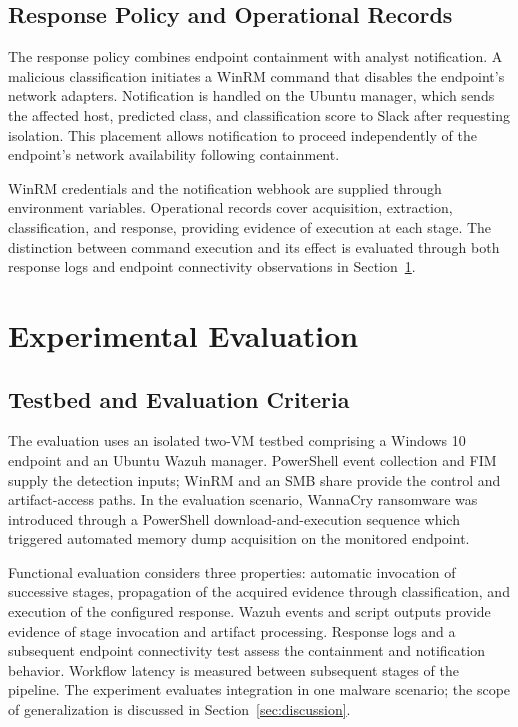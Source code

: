 \documentclass[conference]{IEEEtran}
\begin{document}
\subsection{Response Policy and Operational Records}
The response policy combines endpoint containment with analyst notification. A malicious classification initiates a WinRM command that disables the endpoint's network adapters. Notification is handled on the Ubuntu manager, which sends the affected host, predicted class, and classification score to Slack after requesting isolation. This placement allows notification to proceed independently of the endpoint's network availability following containment.

WinRM credentials and the notification webhook are supplied through environment variables. Operational records cover acquisition, extraction, classification, and response, providing evidence of execution at each stage. The distinction between command execution and its effect is evaluated through both response logs and endpoint connectivity observations in Section~\ref{sec:case}.

\section{Experimental Evaluation}
\label{sec:case}

\subsection{Testbed and Evaluation Criteria}
The evaluation uses an isolated two-VM testbed comprising a Windows 10 endpoint and an Ubuntu Wazuh manager. PowerShell event collection and FIM supply the detection inputs; WinRM and an SMB share provide the control and artifact-access paths. In the evaluation scenario, WannaCry ransomware was introduced through a PowerShell download-and-execution sequence which triggered automated memory dump acquisition on the monitored endpoint.

Functional evaluation considers three properties: automatic invocation of successive stages, propagation of the acquired evidence through classification, and execution of the configured response. Wazuh events and script outputs provide evidence of stage invocation and artifact processing. Response logs and a subsequent endpoint connectivity test assess the containment and notification behavior. Workflow latency is measured between subsequent stages of the pipeline.
The experiment evaluates integration in one malware scenario; the scope of generalization is discussed in Section~\ref{sec:discussion}.
\end{document}
